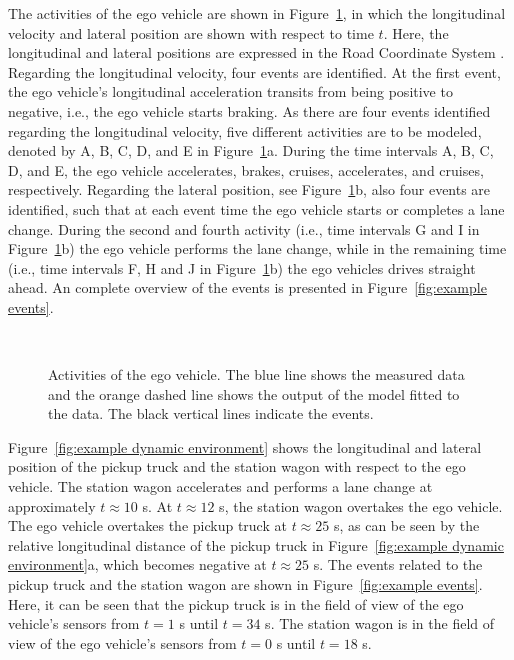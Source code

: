 The activities of the ego vehicle are shown in Figure~\ref{fig:example ego states}, in which the longitudinal velocity and lateral position are shown with respect to time $t$. Here, the longitudinal and lateral positions are expressed in the Road Coordinate System \cite{zofka2015datadrivetrafficscenarios}. Regarding the longitudinal velocity, four events are identified. At the first event, the ego vehicle's longitudinal acceleration transits from being positive to negative, i.e., the ego vehicle starts braking. As there are four events identified regarding the longitudinal velocity, five different activities are to be modeled, denoted by A, B, C, D, and E in Figure~\ref{fig:example ego states}a. During the time intervals A, B, C, D, and E, the ego vehicle accelerates, brakes, cruises, accelerates, and cruises, respectively. Regarding the lateral position, see Figure~\ref{fig:example ego states}b, also four events are identified, such that at each event time the ego vehicle starts or completes a lane change. During the second and fourth activity (i.e., time intervals G and I in Figure~\ref{fig:example ego states}b) the ego vehicle performs the lane change, while in the remaining time (i.e., time intervals F, H and J in Figure~\ref{fig:example ego states}b) the ego vehicles drives straight ahead. An complete overview of the events is presented in Figure~\ref{fig:example events}.

\begin{figure}
	\centering
	\setlength\figureheight{150pt}
	\setlength\figurewidth{248pt}
	\\
	\caption{Activities of the ego vehicle. The blue line shows the measured data and the orange dashed line shows the output of the model fitted to the data. The black vertical lines indicate the events.}
	\label{fig:example ego states}
\end{figure}

Figure~\ref{fig:example dynamic environment} shows the longitudinal and lateral position of the pickup truck and the station wagon with respect to the ego vehicle. The station wagon accelerates and performs a lane change at approximately $t\approx10$ s. At $t\approx12$ s, the station wagon overtakes the ego vehicle. The ego vehicle overtakes the pickup truck at $t\approx25$ s, as can be seen by the relative longitudinal distance of the pickup truck in Figure~\ref{fig:example dynamic environment}a, which becomes negative at $t\approx25$ s. The events related to the pickup truck and the station wagon are shown in Figure~\ref{fig:example events}. Here, it can be seen that the pickup truck is in the field of view of the ego vehicle's sensors from $t=1$ s until $t=34$ s. The station wagon is in the field of view of the ego vehicle's sensors from $t=0$ s until $t=18$ s.


